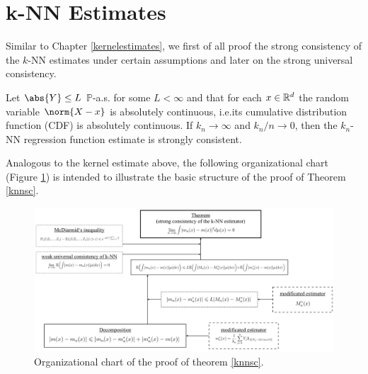\newpage

\section{k-NN Estimates} \label{knnestimates}

Similar to Chapter \ref{kernelestimates}, we first of all proof the strong consistency of the $k$-NN estimates under certain assumptions and later on the strong universal consistency.


\begin{theorem} \label{knnsc}
Let \(\abs{Y} \leq L\) \(\mathbb{P}\)-a.s. for some \(L < \infty\) and that for each \(x \in \mathbb{R}^d\) the random variable \(\norm{X - x}\) is absolutely continuous, i.e.\@ its cumulative distribution function (CDF) is absolutely continuous. If \(k_n \to \infty\) and \(k_n / n \to 0\), then the \(k_n\)-NN regression function estimate is strongly consistent.
\end{theorem}

Analogous to the kernel estimate above, the following organizational chart (Figure \ref{chartknnproof}) is intended to illustrate the basic structure of the proof of Theorem \ref{knnsc}.

\begin{figure}[h] \label{chartknnproof}
    \includegraphics[scale=0.15]{organigramknn.jpeg}
    \centering
    \caption{Organizational chart of the proof of theorem \ref{knnsc}.}
\end{figure}


